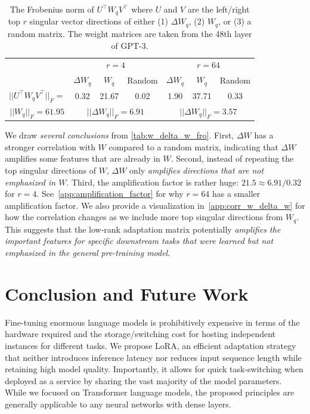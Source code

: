 \documentclass{article} %
\begin{document}
\begin{table}[h]
  \centering
  \begin{tabular}{c|ccc|ccc}
  \hline
  \toprule
                             & \multicolumn{3}{c|}{$r=4$}             & \multicolumn{3}{c}{$r=64$}           \\
                                 & $\Delta W_q$ & $W_q$ & Random  &  $\Delta W_q$ & $W_q$  &  Random \\
  \midrule
  $||U^\top W_qV^\top||_F = $        & 0.32   & 21.67     & 0.02     & 1.90  & 37.71                & 0.33    \\
  \midrule
  $||W_q||_F = 61.95$                & \multicolumn{3}{c|}{$||\Delta W_q||_F = 6.91$}             
  & \multicolumn{3}{c}{$||\Delta W_q||_F = 3.57$}
  \\
  \bottomrule
  \end{tabular}
  \caption{The Frobenius norm of $U^\top W_qV^\top$ where $U$ and $V$ are the left/right top $r$ singular vector directions of either (1) $\Delta W_q$, (2) $W_q$, or (3) a random matrix. The weight matrices are taken from the 48th layer of GPT-3. 
  }
  \label{tab:w_delta_w_fro}
\end{table}

We draw \emph{several conclusions} from \autoref{tab:w_delta_w_fro}.
First, $\Delta W$ has a stronger correlation with $W$ compared to a random matrix, indicating that $\Delta W$ amplifies some features that are already in $W$.
Second, instead of repeating the top singular directions of $W$, $\Delta W$ only \emph{amplifies directions that are not emphasized in $W$}.
Third, the amplification factor is rather huge: $21.5\approx 6.91/0.32$ for $r=4$. 
See~\autoref{app:amplification_factor} for why $r=64$ has a smaller amplification factor.
We also provide a visualization in~\autoref{app:corr_w_delta_w} for how the correlation changes as we include more top singular directions from $W_q$.
This suggests that the low-rank adaptation matrix potentially \emph{amplifies the important features for specific downstream tasks that were learned but not emphasized in the general pre-training model}.

\section{Conclusion and Future Work}

Fine-tuning enormous language models is prohibitively expensive in terms of the hardware required and the storage/switching cost for hosting independent instances for different tasks.
We propose LoRA, an efficient adaptation strategy that neither introduces inference latency nor reduces input sequence length while retaining high model quality.
Importantly, it allows for quick task-switching when deployed as a service by sharing the vast majority of the model parameters.
While we focused on Transformer language models, the proposed principles are generally applicable to any neural networks with dense layers.
\end{document}
